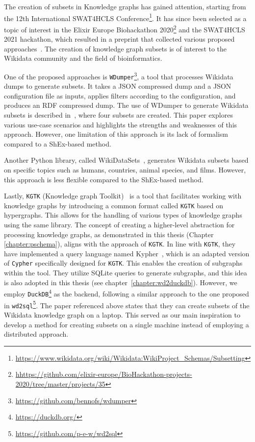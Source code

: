The creation of subsets in Knowledge graphs has gained attention, starting from the 12th International SWAT4HCLS Conference\footnote{\url{https://www.wikidata.org/wiki/Wikidata:WikiProject_Schemas/Subsetting}}. It has since been selected as a topic of interest in the Elixir Europe Biohackathon 2020\footnote{\url{hhttps://github.com/elixir-europe/BioHackathon-projects-2020/tree/master/projects/35}} and the SWAT4HCLS 2021 hackathon, which resulted in a preprint that collected various proposed approaches~\cite{labra-gayo2021}. The creation of knowledge graph subsets is of interest to the Wikidata community and the field of bioinformatics.

One of the proposed approaches is \texttt{WDumper}\footnote{\url{https://github.com/bennofs/wdumper}}, a tool that processes Wikidata dumps to generate subsets. It takes a JSON compressed dump and a JSON configuration file as inputs, applies filters according to the configuration, and produces an RDF compressed dump. The use of WDumper to generate Wikidata subsets is described in~\cite{wdumper}, where four subsets are created. This paper explores various use-case scenarios and highlights the strengths and weaknesses of this approach. However, one limitation of this approach is its lack of formalism compared to a ShEx-based method.

Another Python library, called WikiDataSets~\cite{boschin2019wikidatasets}, generates Wikidata subsets based on specific topics such as humans, countries, animal species, and films. However, this approach is less flexible compared to the ShEx-based method.

Lastly, \texttt{KGTK} (Knowledge graph Toolkit)~\cite{ilievski2021kgtk} is a tool that facilitates working with knowledge graphs by introducing a common format called \texttt{KGTK} based on hypergraphs. This allows for the handling of various types of knowledge graphs using the same library. The concept of creating a higher-level abstraction for processing knowledge graphs, as demonstrated in this thesis (Chapter \ref{chapter:pschema}), aligns with the approach of \texttt{KGTK}. In line with \texttt{KGTK}, they have implemented a query language named Kypher~\cite{chalupsky2021creating}, which is an adapted version of \texttt{Cypher} specifically designed for \texttt{KGTK}. This enables the creation of subgraphs within the tool. They utilize SQLite queries to generate subgraphs, and this idea is also adopted in this thesis (see chapter~\ref{chapter:wd2duckdb}). However, we employ \texttt{DuckDB}\footnote{\url{https://duckdb.org/}} as the backend, following a similar approach to the one proposed in \texttt{wd2sql}\footnote{\url{https://github.com/p-e-w/wd2sql}}. The paper referenced above states that they can create subsets of the Wikidata knowledge graph on a laptop. This served as our main inspiration to develop a method for creating subsets on a single machine instead of employing a distributed approach.

